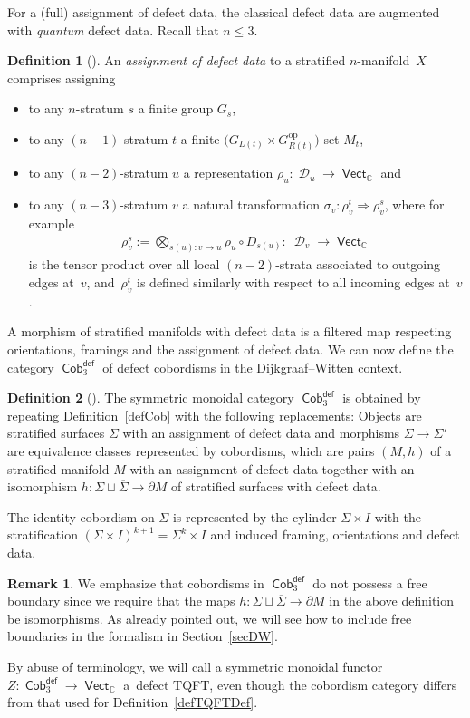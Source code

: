 \documentclass[10pt,a4paper]{amsart}
\DeclareMathOperator{\vect}{\mathsf{Vect}}
\DeclareMathOperator{\C}{\mathbb{C}}
\DeclareMathOperator{\Cob}{\mathsf{Cob}}
\DeclareMathOperator{\cald}{\mathcal{D}}
\numberwithin{equation}{section}
\theoremstyle{definition}
\newtheorem{Definition}[Definition]{Definition}
\newtheorem{Remark}[Remark]{Remark}
\begin{document}
For a (full) assignment of defect data, the classical defect data are augmented with \textit{quantum} defect data. Recall that $n \leq 3$.
\begin{Definition}[{\cite[Definition~4.4]{FMM}}]
 \label{defDefData}
 An \textit{assignment of defect data} to a stratified $n$-mani\-fold~$X$ comprises assigning
 \begin{itemize}\itemsep=0pt
 \item to any $n$-stratum $s$ a finite group $G_s$,
 \item to any $(n-1)$-stratum $t$ a finite $\bigl(G_{L(t)} \times G_{R(t)}^{\mathrm{op}}\bigr)$-set $M_t$,
 \item to any $(n-2)$-stratum $u$ a representation $\rho_u\colon \cald_u \rightarrow \vect_{\C}$ and
 \item to any $(n-3)$-stratum $v$ a natural transformation $\sigma_v\colon \rho_v^t \Rightarrow \rho_v^s$, where for example
 \begin{align*}
 \rho_v^s := \bigotimes_{s(u)\colon v \rightarrow u} \rho_u \circ D_{s(u)} \colon \ \cald_v \rightarrow \vect_{\C}
 \end{align*}
 is the tensor product over all local $(n-2)$-strata associated to outgoing edges at~$v$, and~$\rho_v^t$ is defined similarly with respect to all incoming edges at~$v$.
 \end{itemize}
\end{Definition}
A morphism of stratified manifolds with defect data is a filtered map respecting orientations, framings and the assignment of defect data. We can now define the category $\Cob_3^{\mathsf{def}}$ of defect cobordisms in the Dijkgraaf--Witten context.
\begin{Definition}[{\cite[Definition~4.6]{FMM}}] \label{defCobDW}
 The symmetric monoidal category $\Cob_3^{\mathsf{def}}$ is obtained by repeating Definition~\ref{defCob} with the following replacements: Objects are stratified surfaces $\Sigma$ with an assignment of defect data and morphisms $\Sigma \rightarrow \Sigma'$ are equivalence classes represented by cobordisms, which are pairs $(M, h)$ of a stratified manifold $M$ with an assignment of defect data together with an isomorphism $h\colon \Sigma \sqcup \overline{\Sigma} \rightarrow \partial M $ of stratified surfaces with defect data.

 The identity cobordism on $\Sigma$ is represented by the cylinder $\Sigma \times I$ with the stratification $(\Sigma \times I)^{k+1} = \Sigma^k \times I$ and induced framing, orientations and defect data.
\end{Definition}
\begin{Remark}
 We emphasize that cobordisms in $\Cob_3^{\mathsf{def}}$ do not possess a free boundary since we require that the maps $h\colon \Sigma \sqcup \overline{\Sigma} \rightarrow \partial M $ in the above definition be isomorphisms. As already pointed out, we will see how to include free boundaries in the formalism in Section~\ref{secDW}.
\end{Remark}
By abuse of terminology, we will call a symmetric monoidal functor $Z\colon \Cob_3^{\mathsf{def}} \rightarrow \vect_{\C}$ a~defect TQFT, even though the cobordism category differs from that used for Definition~\ref{defTQFTDef}.
\end{document}
